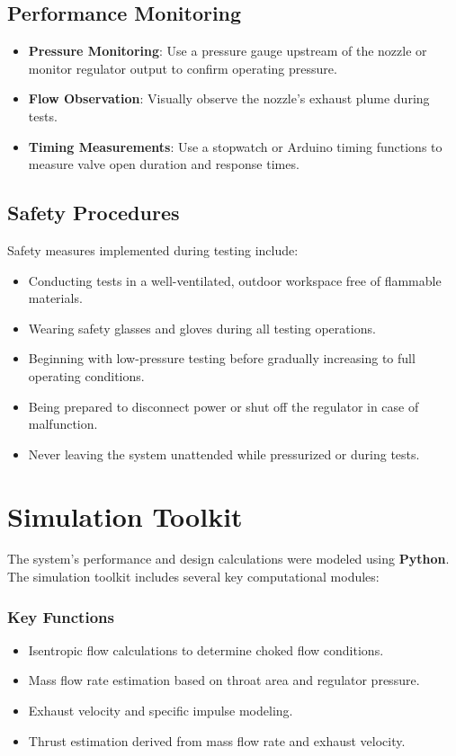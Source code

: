 \documentclass{new-aiaa}
\begin{document}
\subsection{Performance Monitoring}
\begin{itemize}
    \item \textbf{Pressure Monitoring}: Use a pressure gauge upstream of the nozzle or monitor regulator output to confirm operating pressure.
    \item \textbf{Flow Observation}: Visually observe the nozzle’s exhaust plume during tests.
    \item \textbf{Timing Measurements}: Use a stopwatch or Arduino timing functions to measure valve open duration and response times.
\end{itemize}

\subsection{Safety Procedures}
Safety measures implemented during testing include:
\begin{itemize}
    \item Conducting tests in a well-ventilated, outdoor workspace free of flammable materials.
    \item Wearing safety glasses and gloves during all testing operations.
    \item Beginning with low-pressure testing before gradually increasing to full operating conditions.
    \item Being prepared to disconnect power or shut off the regulator in case of malfunction.
    \item Never leaving the system unattended while pressurized or during tests.
\end{itemize}

\section{Simulation Toolkit}

The system’s performance and design calculations were modeled using  \textbf{Python}. The simulation toolkit includes several key computational modules:

\subsubsection{Key Functions}
\begin{itemize}
    \item Isentropic flow calculations to determine choked flow conditions.
    \item Mass flow rate estimation based on throat area and regulator pressure.
    \item Exhaust velocity and specific impulse modeling.
    \item Thrust estimation derived from mass flow rate and exhaust velocity.
\end{itemize}
\end{document}
